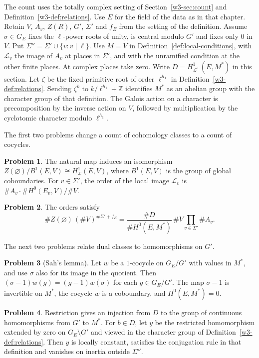 \documentclass[reqno]{amsart}
\newcounter{chap}
\theoremstyle{definition}
\newtheorem{problem}{Problem}[section]
\theoremstyle{plain}
\newcommand{\Z}{\mathbb Z}
\newcommand{\Lc}{\mathcal L}
\begin{document}
The count uses the totally complex setting of
Section~\ref{w3-sec:count} and Definition~\ref{w3-def:relations}.  Use
\(E\) for the field of the data as in that chapter.  Retain \(V\),
\(A_v\), \(Z(R)\), \(G'\), \(\Sigma'\) and \(f_E\) from the setting of
the definition.  Assume \(\sigma\in G_E\) fixes the \(\ell\)-power
roots of unity, is central modulo \(G'\) and fixes only \(0\) in
\(V\).  Put \(\Sigma''=\Sigma'\cup\{v:v\mid\ell\}\).
Use \(M=V\) in Definition~\ref{def:local-conditions}, with
\(\Lc_v\) the image of \(A_v\) at places in \(\Sigma'\), and with
the unramified condition at the other finite places.  At complex
places take zero.  Write \(D=H^1_{\Lc^\perp}(E,M^*)\) in this section.
Let \(\zeta\) be the fixed primitive root of order \(\ell^{h_1}\) in
Definition~\ref{w3-def:relations}.  Sending \(\zeta^k\) to
\(k/\ell^{h_1}+\Z\) identifies \(M^*\) as an abelian group with the
character group of that definition.  The Galois action on a character
is precomposition by the inverse action on \(V\), followed by
multiplication by the cyclotomic character modulo \(\ell^{h_1}\).

The first two problems change a count of cohomology classes to a
count of cocycles.

\begin{problem}\label{pr:quotient}
The natural map induces an isomorphism
\(Z(\varnothing)/B^1(E,V)\cong H^1_{\Lc}(E,V)\),
where \(B^1(E,V)\) is the group of global coboundaries.
For \(v\in\Sigma'\), the order of the local image \(\Lc_v\) is
\(\#A_v\cdot \#H^0(E_v,V)/\#V\).
\end{problem}

\begin{problem}\label{pr:count-classes}
The orders satisfy
\[
  \#Z(\varnothing)\,(\#V)^{\#\Sigma'+f_E} =
  \frac{\#D}{\#H^0(E,M^*)}\,\#V\prod_{v\in\Sigma'}\#A_v .
\]
\end{problem}

The next two problems relate dual classes to homomorphisms on \(G'\).

\begin{problem}[Sah's lemma]\label{pr:sah}
Let \(w\) be a \(1\)-cocycle on \(G_E/G'\) with values in \(M^*\),
and use \(\sigma\) also for its image in the quotient.  Then
\((\sigma-1)w(g)=(g-1)w(\sigma)\) for each \(g\in G_E/G'\).
The map \(\sigma-1\) is invertible on \(M^*\), the cocycle \(w\) is a
coboundary, and \(H^0(E,M^*)=0\).
\end{problem}

\begin{problem}\label{pr:restrict}
Restriction gives an injection from \(D\) to the group of continuous
homomorphisms from \(G'\) to \(M^*\).  For \(b\in D\), let \(y\) be
the restricted homomorphism extended by zero on \(G_E\setminus G'\)
and viewed in the character group of Definition~\ref{w3-def:relations}.
Then \(y\) is locally constant, satisfies the conjugation rule in that
definition and vanishes on inertia outside \(\Sigma''\).
\end{problem}
\end{document}
